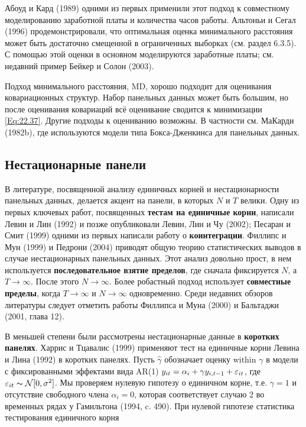 Абоуд и Кард (1989) одними из первых применили этот подход к совместному моделированию заработной платы и количества часов работы. Альтоньи и Сегал (1996) продемонстрировали, что оптимальная оценка минимального расстояния может быть достаточно смещенной в ограниченных выборках (см. раздел 6.3.5). С помощью этой оценки в основном моделируются заработные платы; см. недавний пример Бейкер и Солон (2003).

Подход минимального расстояния, MD,  хорошо подходит для оценивания ковариационных структур. Набор панельных данных может быть большим, но после оценивания ковариаций всё оценивание сводится к  минимизации \ref{Eq:22.37}. Другие подходы к оцениванию возможны. В частности см. МаКарди (1982b), где используются модели типа Бокса-Дженкинса для панельных данных. 

\subsection{Нестационарные панели}

В литературе, посвященной анализу единичных корней и нестационарности панельных данных, делается акцент на панели, в которых $N$ и $T$ велики. Одну из первых ключевых работ, посвященных \textbf{тестам на единичные корни}, написали Левин и Лин (1992) и позже опубликовали Левин, Лин и Чу (2002); Песаран и Смит (1999) одними из первых написали работу о \textbf{коинтеграции}. Филлипс и Мун (1999)  и Педрони (2004) приводят общую теорию статистических выводов в случае нестационарных панельных данных. Этот анализ довольно прост, в нем используется \textbf{последовательное взятие пределов}, где сначала фиксируется  $N$, а $T \rightarrow \infty$. После этого $N \rightarrow \infty$. Более робастный подход использует \textbf{совместные пределы}, когда  $T \rightarrow \infty$ и $ N \rightarrow \infty$ одновременно. Среди недавних обзоров литературы следует отметить работы Филлипса и Муна (2000) и Бальтаджи (2001, глава 12). 

В меньшей степени были рассмотрены нестационарные данные в \textbf{коротких панелях}. Харрис и Тцавалис (1999) применяют тест на единичные корни Левина и Лина (1992) в коротких панелях. Пусть $\hat{\gamma}$ обозначает оценку within $\gamma$ в модели с фиксированными эффектами вида AR(1) $y_{it}=\alpha_i+\gamma y_{i,t-1} + \varepsilon_{it}$, где $\varepsilon_{it} \thicksim \mathcal N [0, \sigma^2]$. Мы проверяем нулевую гипотезу о единичном корне, т.е. $\gamma=1$ и отсутствие свободного члена $\alpha_i=0$, которая соответствует случаю 2 во временных рядах у Гамильтона (1994, c. 490). При нулевой гипотезе статистика тестирования единичного корня

